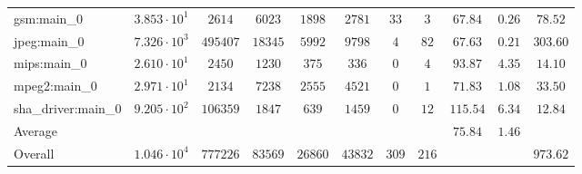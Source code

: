 \begin{tabular}{|l|c|c|c|c|c|c|c|c|c|c|}
gsm:main\_0             & $ 3.853 \cdot 10^{1} $ & $ 2614   $ & $ 6023  $ & $ 1898  $ & $ 2781  $ & $ 33  $ & $ 3   $ & $ 67.84       $ & $ 0.26    $ & $ 78.52   $ \\
jpeg:main\_0            & $ 7.326 \cdot 10^{3} $ & $ 495407 $ & $ 18345 $ & $ 5992  $ & $ 9798  $ & $ 4   $ & $ 82  $ & $ 67.63       $ & $ 0.21    $ & $ 303.60  $ \\
mips:main\_0            & $ 2.610 \cdot 10^{1} $ & $ 2450   $ & $ 1230  $ & $ 375   $ & $ 336   $ & $ 0   $ & $ 4   $ & $ 93.87       $ & $ 4.35    $ & $ 14.10   $ \\
mpeg2:main\_0           & $ 2.971 \cdot 10^{1} $ & $ 2134   $ & $ 7238  $ & $ 2555  $ & $ 4521  $ & $ 0   $ & $ 1   $ & $ 71.83       $ & $ 1.08    $ & $ 33.50   $ \\
sha\_driver:main\_0     & $ 9.205 \cdot 10^{2} $ & $ 106359 $ & $ 1847  $ & $ 639   $ & $ 1459  $ & $ 0   $ & $ 12  $ & $ 115.54      $ & $ 6.34    $ & $ 12.84   $ \\
\hline
Average                 & $                    $ & $        $ & $       $ & $       $ & $       $ & $     $ & $     $ & $ 75.84       $ & $ 1.46    $ & $         $ \\
\hline
Overall                 & $ 1.046 \cdot 10^{4} $ & $ 777226 $ & $ 83569 $ & $ 26860 $ & $ 43832 $ & $ 309 $ & $ 216 $ & $             $ & $         $ & $ 973.62  $ \\
\hline
\end{tabular}

